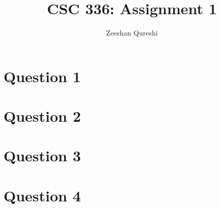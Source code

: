 \documentclass[a4paper]{article}
\title{CSC 336: Assignment 1}
\author{Zeeshan Qureshi}
\begin{document}
  \maketitle

  \section*{Question 1}

  \section*{Question 2}

  \section*{Question 3}

  \section*{Question 4}
\end{document}
